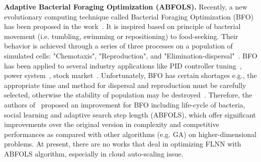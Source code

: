 \documentclass[runningheads]{llncs}
\def \GN#1{\textcolor{blue}{~#1}}
\begin{document}
\textbf{Adaptive Bacterial Foraging Optimization (ABFOLS).}
Recently, a new evolutionary computing technique called Bacterial Foraging Optimization (BFO) has been proposed in the work~\cite{ref_passino}. It is inspired based on principle of bacterial movement (i.e. tumbling, swimming or repositioning) to food-seeking. 
Their behavior is achieved through a series of three processes on a population of simulated cells: "Chemotaxis", "Reproduction", and "Elimination-dispersal"~\cite{ref_passino}. BFO has been applied to several industry applications like PID controller tuning~\cite{ref_kim}, power system~\cite{ref_ali}, stock market~\cite{ref_ritanjali_majhi}. 
Unfortunately, BFO has certain shortages e.g., the appropriate time and method for dispersal and reproduction must be carefully selected, otherwise the stability of population may be destroyed~\cite{ref_yan}. 
Therefore, the authors of~\cite{ref_yan} proposed an improvement for BFO including life-cycle of bacteria, social learning and adaptive search step length (ABFOLS), 
which offer significant improvements over the original version in complexity and competitive performances as compared with other algorithms (e.g. GA) on higher-dimensional problems. 
At present, there are no works that deal in optimizing FLNN with ABFOLS algorithm, especially in cloud auto-scaling issue.

\end{document}
